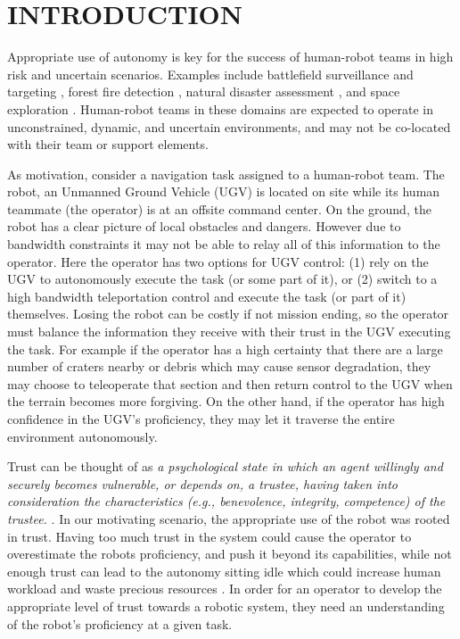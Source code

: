 \documentclass[aaai]{article}
\begin{document}
\section{INTRODUCTION} \label{INTRO}
Appropriate use of autonomy is key for the success of human-robot teams in high risk and uncertain scenarios. Examples include battlefield surveillance and targeting \cite{naval_urban_uav,history_of_uavs}, forest fire detection \cite{uav_fire_detection,uav_fire_detection_monitoring,dist_wildfire}, natural disaster assessment \cite{disaster_imaging,disaster_management}, and space exploration \cite{lunar_mining,exploration_robots_space}. Human-robot teams in these domains are expected to operate in unconstrained, dynamic, and uncertain environments, and may not be co-located with their team or support elements.

As motivation, consider a navigation task assigned to a human-robot team. The robot, an Unmanned Ground Vehicle (UGV) is located on site while its human teammate (the operator) is at an offsite command center. On the ground, the robot has a clear picture of local obstacles and dangers. However due to bandwidth constraints it may not be able to relay all of this information to the operator. Here the operator has two options for UGV control: (1) rely on the UGV to autonomously execute the task (or some part of it), or (2) switch to a high bandwidth teleportation control and execute the task (or part of it) themselves. Losing the robot can be costly if not mission ending, so the operator must balance the information they receive with their trust in the UGV executing the task. For example if the operator has a high certainty that there are a large number of craters nearby or debris which may cause sensor degradation, they may choose to teleoperate that section and then return control to the UGV when the terrain becomes more forgiving. On the other hand, if the operator has high confidence in the UGV's proficiency, they may let it traverse the entire environment autonomously.

Trust can be thought of as \emph{a psychological state in which an agent willingly and securely becomes vulnerable, or depends on, a trustee, having taken into consideration the characteristics (e.g., benevolence, integrity, competence) of the trustee.} \cite{israelsen2019dave}. In our motivating scenario, the appropriate use of the robot was rooted in trust. Having too much trust in the system could cause the operator to overestimate the robots proficiency, and push it beyond its capabilities, while not enough trust can lead to the autonomy sitting idle which could increase human workload and waste precious resources \cite{misuse_disuse}. In order for an operator to develop the appropriate level of trust towards a robotic system, they need an understanding of the robot's proficiency at a given task.
\end{document}

